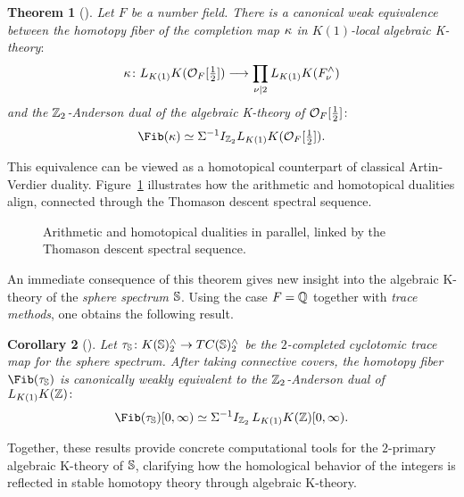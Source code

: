 \documentclass[11pt]{article}
\newtheorem{theorem}{Theorem}
\newtheorem{corollary}[theorem]{Corollary}
\begin{document}
\begin{theorem}[\cite{Cho}]
Let $F$ be a number field.
There is a canonical weak equivalence between  the {\it homotopy fiber of the completion map} $\kappa$ in $K(1)$-local algebraic K-theory$\colon$
\[\kappa\colon L_{K(1)}K({\mathcal{O}}_F[\tfrac{1}{2}]) \longrightarrow \prod_{\nu \mid 2} L_{K(1)}K(F_\nu^\wedge)\]
and the $\mathbb{Z}_2$-Anderson dual of the algebraic K-theory of ${\mathcal{O}}_F[\tfrac{1}{2}]\colon$
 \begin{equation}\label{fib}
 \Fib(\ka) \simeq \SI^{-1} I_{\bZ_2} L_{K(1)}K(\calO_F[\tfrac{1}{2}]).
\end{equation}
\end{theorem}

This equivalence can be viewed as a homotopical counterpart of classical Artin-Verdier duality.
Figure~\ref{fig:duality} illustrates how the arithmetic and homotopical dualities align, connected through the Thomason descent spectral sequence.
\begin{figure}[h]
\centering
{}
\captionsetup{font=footnotesize, skip=0em}
\caption{
Arithmetic and homotopical dualities in parallel,
linked by the Thomason descent spectral sequence.
}
\label{fig:duality}
\end{figure}

An immediate consequence of this theorem gives new insight into the algebraic K-theory of the {\it sphere spectrum} $\mathbb{S}$.
Using the case $F=\mathbb{Q}$ together with {\it trace methods}, one obtains the following result.

\begin{corollary}[\cite{Cho}]
Let $\tau_{\mathbb{S}}\colon K(\mathbb{S})_2^\wedge \to TC(\mathbb{S})_2^\wedge$ be the $2$-completed cyclotomic trace map for the sphere spectrum.
After taking connective covers, the homotopy fiber $\Fib(\ta_\bS)$ is canonically weakly equivalent to the $\mathbb{Z}_2$-Anderson dual of $L_{K(1)}K(\mathbb{Z})\colon$
\[\Fib(\ta_\bS)[0,\infty) \simeq \Sigma^{-1} I_{\bZ_2}\, L_{K(1)}K(\bZ)[0,\infty).\]
\end{corollary}
Together, these results provide concrete computational tools for the $2$-primary algebraic K-theory of $\mathbb{S}$, clarifying how the homological behavior of the integers is reflected in stable homotopy theory through algebraic K-theory.
\end{document}
